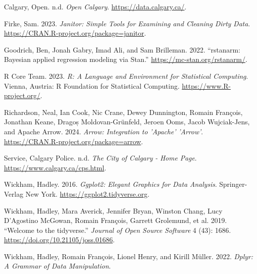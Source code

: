 \documentclass[
  letterpaper,
  DIV=11,
  numbers=noendperiod]{scrartcl}
\newlength{\cslhangindent}
\newenvironment{CSLReferences}[2] %
 {\begin{list}{}{%
  \setlength{\itemindent}{0pt}
  \setlength{\leftmargin}{0pt}
  \setlength{\parsep}{0pt}
  \ifodd #1
   \setlength{\leftmargin}{\cslhangindent}
   \setlength{\itemindent}{-1\cslhangindent}
  \fi
  \setlength{\itemsep}{#2\baselineskip}}}
 {\end{list}}
\begin{document}
\label{refs}
\begin{CSLReferences}{1}{0}
Calgary, Open. n.d. \emph{Open Calgary}. \url{https://data.calgary.ca/}.

Firke, Sam. 2023. \emph{Janitor: Simple Tools for Examining and Cleaning
Dirty Data}. \url{https://CRAN.R-project.org/package=janitor}.

Goodrich, Ben, Jonah Gabry, Imad Ali, and Sam Brilleman. 2022.
{``{rstanarm: {Bayesian} applied regression modeling via {Stan}}.''}
\url{https://mc-stan.org/rstanarm/}.

R Core Team. 2023. \emph{{R: A Language and Environment for Statistical
Computing}}. Vienna, Austria: R Foundation for Statistical Computing.
\url{https://www.R-project.org/}.

Richardson, Neal, Ian Cook, Nic Crane, Dewey Dunnington, Romain
François, Jonathan Keane, Dragoș Moldovan-Grünfeld, Jeroen Ooms, Jacob
Wujciak-Jens, and Apache Arrow. 2024. \emph{Arrow: Integration to
'Apache' 'Arrow'}. \url{https://CRAN.R-project.org/package=arrow}.

Service, Calgary Police. n.d. \emph{The City of Calgary - Home Page}.
\url{https://www.calgary.ca/cps.html}.

Wickham, Hadley. 2016. \emph{Ggplot2: Elegant Graphics for Data
Analysis}. Springer-Verlag New York.
\url{https://ggplot2.tidyverse.org}.

Wickham, Hadley, Mara Averick, Jennifer Bryan, Winston Chang, Lucy
D'Agostino McGowan, Romain François, Garrett Grolemund, et al. 2019.
{``Welcome to the {tidyverse}.''} \emph{Journal of Open Source Software}
4 (43): 1686. \url{https://doi.org/10.21105/joss.01686}.

Wickham, Hadley, Romain François, Lionel Henry, and Kirill Müller. 2022.
\emph{Dplyr: A Grammar of Data Manipulation}.

\end{CSLReferences}
\end{document}
